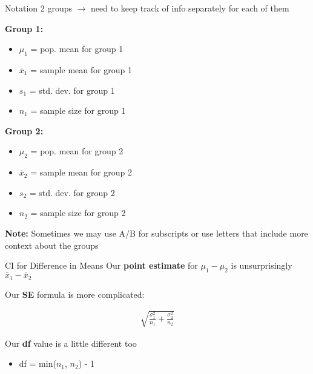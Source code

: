 \documentclass{beamer}
\begin{document}
\begin{frame}{Notation}
2 groups $\rightarrow$ need to keep track of info separately for each of them \vspace{2mm}

\textbf{Group 1:}
\begin{itemize}
    \item $\mu_1$ = pop. mean for group 1
    \item $\overline{x}_1$ = sample mean for group 1
    \item $s_1$ = std. dev. for group 1
    \item $n_1$ = sample size for group 1
\end{itemize} \vspace{3mm}

\textbf{Group 2:}
\begin{itemize}
    \item $\mu_2$ = pop. mean for group 2
    \item $\overline{x}_2$ = sample mean for group 2
    \item $s_2$ = std. dev. for group 2
    \item $n_2$ = sample size for group 2
\end{itemize} \vspace{4mm}

\textbf{Note:} Sometimes we may use A/B for subscripts or use letters that include more context about the groups
\end{frame}

\begin{frame}{CI for Difference in Means}
Our \textbf{point estimate} for $\mu_1 - \mu_2$ is unsurprisingly $\overline{x}_1 - \overline{x}_2$ \vspace{6mm}

Our \textbf{SE} formula is more complicated: \vspace{-4mm}

\begin{align*}
\sqrt{\frac{\sigma_1^2}{n_1} + \frac{\sigma_2^2}{n_2}}
\end{align*} \vspace{6mm}

Our \textbf{df} value is a little different too
\begin{itemize}
    \item df = min($n_1$, $n_2$) - 1
\end{itemize}
\end{frame}
\end{document}
